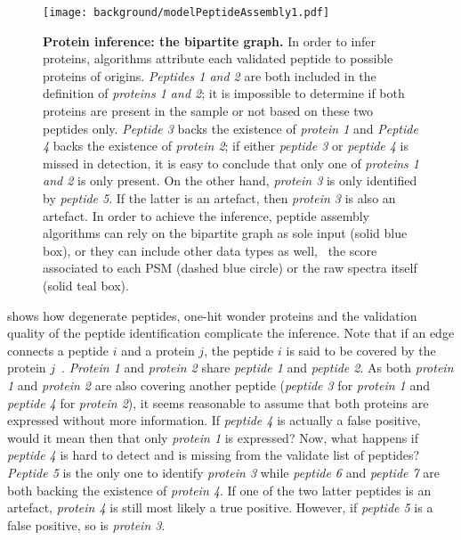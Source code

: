 \begin{figure}[!htb]
    \texttt{[image: background/modelPeptideAssembly1.pdf]}\centering
    \vspace{-0.2mm}
    \caption[Protein inference: the bipartite graph]{\label{fig:bipartite}%
    \textbf{Protein inference: the bipartite graph.} In order to infer proteins,
    algorithms attribute each validated peptide to possible proteins of origins.
    \textit{Peptides 1 and 2} are both included in the definition of
    \textit{proteins 1 and 2};
    it is impossible to determine if both proteins are present in the sample or
    not based on these two peptides only.
    \textit{Peptide 3} backs the existence of \textit{protein 1} and
    \textit{Peptide 4} backs the existence of \textit{protein 2};
    if either \textit{peptide 3} or \textit{peptide 4} is missed in detection,
    it is easy to conclude that only one of \textit{proteins 1 and 2}
    is only present.
    On the other hand, \textit{protein 3} is only identified by \textit{peptide 5}.
    If the latter is an artefact, then \textit{protein 3} is also an artefact.
    In order to achieve the inference,
    peptide assembly algorithms can rely on
    the bipartite graph as sole input (solid blue box),
    or they can include other data types as well,
    \eg\ the score associated to each \gls{PSM} (dashed blue circle) or
    the raw spectra itself (solid teal box).
    }
\end{figure}

 shows how degenerate peptides, one-hit wonder proteins
and the validation quality of the peptide identification
complicate the inference.
Note that if an edge connects a peptide $i$ and a protein $j$,
the peptide $i$ is said to be covered by the protein $j$~.
\textit{Protein 1} and \textit{protein 2} share
\textit{peptide 1} and \textit{peptide 2}.
As both \textit{protein 1} and \textit{protein 2} are also covering
another peptide (\textit{peptide 3} for \textit{protein 1}
and \textit{peptide 4} for \textit{protein 2}),
it seems reasonable to assume that both proteins are expressed without more information.
If \textit{peptide 4} is actually a false positive,
would it mean then that only \textit{protein 1} is expressed?
Now, what happens if \textit{peptide 4} is hard to detect and
is missing from the validate list of peptides?
\textit{Peptide 5} is the only one to identify \textit{protein 3}
while \textit{peptide 6} and \textit{peptide 7} are
both backing the existence of \textit{protein 4}.
If one of the two latter peptides is an artefact,
\textit{protein 4} is still most likely a true positive.
However, if \textit{peptide 5} is a false positive,
so is \textit{protein 3}.

